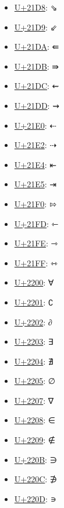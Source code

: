 \begin{itemize}
	\item \href{https://decodeunicode.org/en/u+21D8}{U+21D8}: ⇘
	\item \href{https://decodeunicode.org/en/u+21D9}{U+21D9}: ⇙
	\item \href{https://decodeunicode.org/en/u+21DA}{U+21DA}: ⇚
	\item \href{https://decodeunicode.org/en/u+21DB}{U+21DB}: ⇛
	\item \href{https://decodeunicode.org/en/u+21DC}{U+21DC}: ⇜
	\item \href{https://decodeunicode.org/en/u+21DD}{U+21DD}: ⇝
	\item \href{https://decodeunicode.org/en/u+21E0}{U+21E0}: ⇠
	\item \href{https://decodeunicode.org/en/u+21E2}{U+21E2}: ⇢
	\item \href{https://decodeunicode.org/en/u+21E4}{U+21E4}: ⇤
	\item \href{https://decodeunicode.org/en/u+21E5}{U+21E5}: ⇥
	\item \href{https://decodeunicode.org/en/u+21F0}{U+21F0}: ⇰
	\item \href{https://decodeunicode.org/en/u+21FD}{U+21FD}: ⇽
	\item \href{https://decodeunicode.org/en/u+21FE}{U+21FE}: ⇾
	\item \href{https://decodeunicode.org/en/u+21FF}{U+21FF}: ⇿
	\item \href{https://decodeunicode.org/en/u+2200}{U+2200}: ∀
	\item \href{https://decodeunicode.org/en/u+2201}{U+2201}: ∁
	\item \href{https://decodeunicode.org/en/u+2202}{U+2202}: ∂
	\item \href{https://decodeunicode.org/en/u+2203}{U+2203}: ∃
	\item \href{https://decodeunicode.org/en/u+2204}{U+2204}: ∄
	\item \href{https://decodeunicode.org/en/u+2205}{U+2205}: ∅
	\item \href{https://decodeunicode.org/en/u+2207}{U+2207}: ∇
	\item \href{https://decodeunicode.org/en/u+2208}{U+2208}: ∈
	\item \href{https://decodeunicode.org/en/u+2209}{U+2209}: ∉
	\item \href{https://decodeunicode.org/en/u+220B}{U+220B}: ∋
	\item \href{https://decodeunicode.org/en/u+220C}{U+220C}: ∌
	\item \href{https://decodeunicode.org/en/u+220D}{U+220D}: ∍

\end{itemize}
